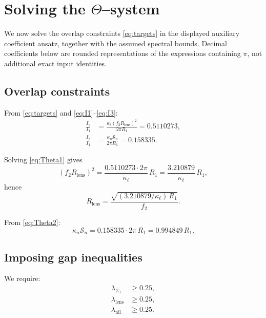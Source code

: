 \documentclass[11pt]{article}
\begin{document}
\section{Solving the \texorpdfstring{$\Theta$}{Theta}--system}

We now solve the overlap constraints \eqref{eq:targets} in the displayed
auxiliary coefficient ansatz, together with the assumed spectral bounds.
Decimal coefficients below are rounded representations of the expressions
containing $\pi$, not additional exact input identities.

\subsection{Overlap constraints}

From \eqref{eq:targets} and \eqref{eq:I1}--\eqref{eq:I3}:
\begin{align}
\frac{I_2}{I_1}
&=
\frac{\kappa_\ell (f_2R_{\mathrm{lens}})^2}{2\pi R_1}
= 0.5110273,
\label{eq:Theta1}\\
\frac{I_3}{I_1}
&=
\frac{\kappa_n\mathcal{S}_n}{2\pi R_1}
= 0.158335.
\label{eq:Theta2}
\end{align}

Solving \eqref{eq:Theta1} gives
\begin{equation}
(f_2R_{\mathrm{lens}})^2
=
\frac{0.5110273\cdot 2\pi}{\kappa_\ell}\,R_1
=
\frac{3.210879}{\kappa_\ell}\,R_1,
\label{eq:RlSolve}
\end{equation}
hence
\begin{equation}
R_{\mathrm{lens}}
=
\frac{\sqrt{(3.210879/\kappa_\ell)\,R_1}}{f_2}.
\label{eq:RlFinal}
\end{equation}

From \eqref{eq:Theta2}:
\begin{equation}
\kappa_n\mathcal{S}_n
=
0.158335\cdot 2\pi\,R_1
=
0.994849\,R_1.
\label{eq:SnSolve}
\end{equation}

\subsection{Imposing gap inequalities}

We require:
\begin{align}
\lambda_{\Sigma_1} &\ge 0.25,
\label{eq:gap1}\\
\lambda_{\mathrm{lens}} &\ge 0.25,
\label{eq:gap2}\\
\lambda_{\mathrm{nil}} &\ge 0.25.
\label{eq:gap3}
\end{align}
\end{document}
